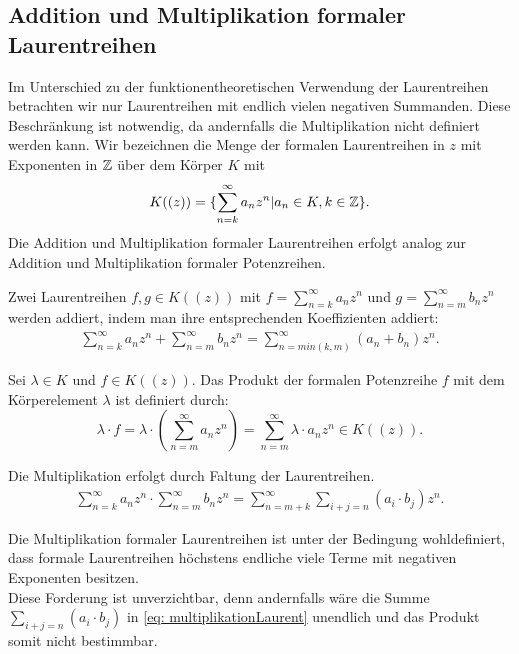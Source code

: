 \subsection{Addition und Multiplikation formaler Laurentreihen}\label{RechnenMitLaurentreihen}
%
%
Im Unterschied zu der funktionentheoretischen Verwendung der Laurentreihen betrachten wir nur Laurentreihen mit endlich vielen negativen Summanden. Diese Beschränkung ist notwendig, da andernfalls die Multiplikation nicht definiert werden kann.
Wir bezeichnen die Menge der formalen Laurentreihen in $z$ mit Exponenten in $\mathbb{Z}$ über dem Körper $K$ mit
\begin{equation*} %
K((z)) = \lbrace \sum_{n =k}^{\infty} a_nz^n \vert a_n \in K, k \in \Z\rbrace.
\end{equation*} 
Die Addition und Multiplikation formaler Laurentreihen erfolgt analog zur Addition und Multiplikation formaler Potenzreihen.
\begin{defn}\label{AdditionLreihen}
Zwei Laurentreihen $f, g \in K((z))$ mit $f = \sum_{n=k}^\infty a_n z^n$ und $g= \sum_{n=m}^\infty b_n z^n$ werden addiert, indem man ihre entsprechenden Koeffizienten addiert: 
%
\begin{eqnarray}
\sum_{n=k}^\infty a_n z^n  +  \sum_{n=m}^\infty b_n z^n = \sum_{n = min(k, m)}^{\infty}(a_n + b_n) z^n.
\end{eqnarray}
\end{defn}
%
%
% 
%
\begin{defn}\label{MultiplikationKLreihen}
Sei $\lambda \in K$ und $f \in K\left(\left( z \right)\right)$. Das Produkt der formalen Potenzreihe $f$ mit dem Körperelement $\lambda$ ist definiert durch:
\[\lambda\cdot f = \lambda\cdot \left(\sum_{n=m}^{\infty}a_nz^n\right) = \sum_{n=m}^{\infty} \lambda\cdot  a_nz^n \in K\left(\left( z\right)\right). 
\]
\end{defn}
%
%
%
\begin{defn}\label{MultiplikationLreihen}
Die Multiplikation erfolgt durch Faltung der Laurentreihen.
\begin{eqnarray}
\label{eq: multiplikationLaurent}
\sum_{n=k}^{\infty} a_n z^n  \cdot  \sum_{n=m}^{\infty} b_n z^n = \sum_{n = m+k}^{\infty}\sum_{i+j=n}^{}\left(a_i \cdot b_j\right) z^n. 
\end{eqnarray}
%

\end{defn}
%
\begin{bem}
Die Multiplikation formaler Laurentreihen ist unter der Bedingung wohldefiniert, dass formale Laurentreihen höchstens endliche viele Terme mit negativen Exponenten besitzen. \\
Diese Forderung ist unverzichtbar, denn andernfalls wäre die Summe $\sum_{i+j=n}^{}\left(a_i \cdot b_j\right)$ in \ref{eq: multiplikationLaurent} unendlich und das Produkt somit nicht bestimmbar.
\end{bem}

